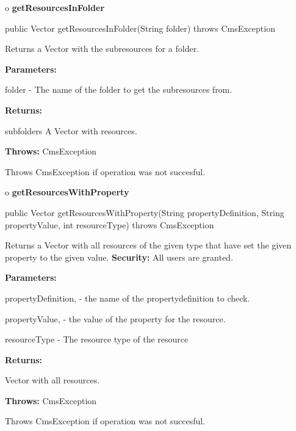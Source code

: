 o {\bf getResourcesInFolder} 

\begin{PRE}
 public Vector getResourcesInFolder(String folder) throws CmsException
\end{PRE}

\begin{description}
\htmlDD Returns a Vector with the subresources for a folder.\htmlBR

\begin{description}
\item {\bf Parameters:}  

folder - The name of the folder to get the subresources from.  
\item {\bf Returns:}  

subfolders A Vector with resources.  
\item {\bf Throws:} CmsException  

Throws CmsException if operation was not succesful.  
\end{description}

\end{description}

o {\bf getResourcesWithProperty} 

\begin{PRE}
 public Vector getResourcesWithProperty(String propertyDefinition,
                                        String propertyValue,
                                        int resourceType) throws CmsException
\end{PRE}

\begin{description}
\htmlDD Returns a Vector with all resources of the given type that have set
the given property to the given value. {\bf Security:} All users are granted. 

\begin{description}
\item {\bf Parameters:}  

propertyDefinition, - the name of the propertydefinition to check.  

propertyValue, - the value of the property for the resource.  

resourceType - The resource type of the resource  
\item {\bf Returns:}  

Vector with all resources.  
\item {\bf Throws:} CmsException  

Throws CmsException if operation was not succesful.  
\end{description}

\end{description}

